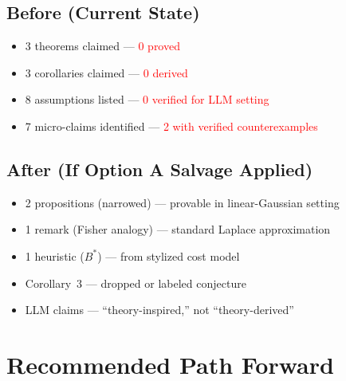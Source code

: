 \documentclass[11pt,a4paper]{article}
\begin{document}
\subsection{Before (Current State)}

\begin{itemize}[nosep]
\item 3 theorems claimed --- \textcolor{red}{0 proved}
\item 3 corollaries claimed --- \textcolor{red}{0 derived}
\item 8 assumptions listed --- \textcolor{red}{0 verified for LLM setting}
\item 7 micro-claims identified --- \textcolor{red}{2 with verified counterexamples}
\end{itemize}

\subsection{After (If Option A Salvage Applied)}

\begin{itemize}[nosep]
\item 2 propositions (narrowed) --- provable in linear-Gaussian setting
\item 1 remark (Fisher analogy) --- standard Laplace approximation
\item 1 heuristic ($B^*$) --- from stylized cost model
\item Corollary~3 --- dropped or labeled conjecture
\item LLM claims --- ``theory-inspired,'' not ``theory-derived''
\end{itemize}

\section{Recommended Path Forward}
\end{document}
